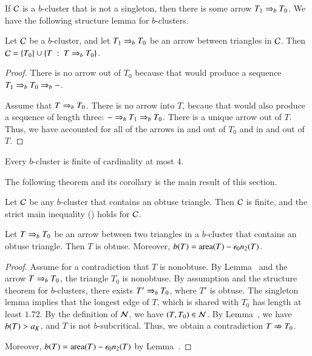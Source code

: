 If $\mathcal C$ is a $b$-cluster that is not a singleton, then there is
some arrow $T_1\Rightarrow_{b} T_0$.  We have the following structure
lemma for $b$-clusters.

\begin{lemma}
  Let $\mathcal C$ be a $b$-cluster, and let $T_1\Rightarrow_{b} T_0$ be an
  arrow between triangles in $\mathcal C$.
  Then $\mathcal C = \{T_0\}\cup \{T \ :\  T\Rightarrow_{b} T_0\}$.
\end{lemma}

\begin{proof}  There is no arrow out of $T_0$ because that
would produce a sequence $T_1\Rightarrow_{b} T_0\Rightarrow_{b} -$.  

Assume that $T\Rightarrow_{b} T_0$.  There is
no arrow into $T$,  becaue that would also produce a sequence
of length three: $- \Rightarrow_{b} T_1 \Rightarrow_{b} T_0$.  There is a unique arrow out of $T$.
Thus, we have accounted for all of the arrows in and out of $T_0$ and in and
out of $T$.
\end{proof}

\begin{corollary}
  Every $b$-cluster is finite of cardinality at most $4$.
\end{corollary}


The following theorem and its corollary is the main result of this
section.  

\begin{theorem}  
  Let $\mathcal C$ be any $b$-cluster that contains an obtuse triangle.  Then
  $\mathcal C$ is finite, and the strict main inequality
  () holds for $\mathcal C$.
\end{theorem}

\begin{lemma} Let $T\Rightarrow_{b} T_0$ be an arrow between two triangles in
a $b$-cluster that contains an obtuse triangle.  Then $T$ is obtuse.
Moreover, $b(T) = {\operatorname{area}}(T) -\epsilon_0 n_2(T)$.
\end{lemma}

\begin{proof} Assume for a contradiction that $T$ is nonobtuse.  By Lemma~
and the arrow $T\Rightarrow_{b} T_0$, the triangle $T_0$ is nonobtuse.  By assumption and the structure
theorem for $b$-clusters, there exists
$T'\Rightarrow_{b} T_0$, where $T'$ is obtuse.
The singleton lemma implies that the longest edge of $T$, which is shared with $T_0$ has length
at least $1.72$.  By the definition of $\mathcal N$, we have $(T,T_0)\in\mathcal N$.   By Lemma~, we
have $b(T)>a_K$, and $T$ is not $b$-subcritical.  Thus, we obtain a contradiction $T\nRightarrow T_0$.

Moreover, $b(T) = {\operatorname{area}}(T) -\epsilon_0 n_2(T)$ by Lemma~.
\end{proof}

